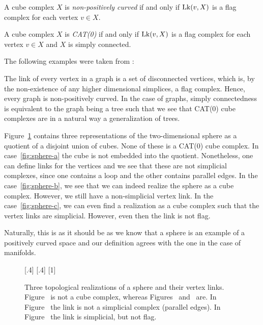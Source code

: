 \begin{thm}
  \label{thm:link}
  A cube complex \(X\) is \emph{non-positively curved} if and only if \(\operatorname{Lk}(v,X)\) is a flag complex for each vertex \(v \in X\).

  A cube complex \(X\) is \emph{CAT(0)} if and only if \(\operatorname{Lk}(v,X)\)  is a flag complex for each vertex \(v \in X\) and \(X\) is simply connected.
\end{thm}

The following examples were taken from \textcite{sageev-lecture-notes}:
\begin{bsp}[Graphs]
  \label{bsp:ccc-graph}
  The link of every vertex in a graph is a set of disconnected vertices, which is, by the non-existence of any higher dimensional simplices, a flag complex. Hence, every graph is non-positively curved. In the case of graphs, simply connectedness is equivalent to the graph being a tree such that we see that CAT(0) cube complexes are in a natural way a generalization of trees.
\end{bsp}
\begin{bsp}[Sphere]
  \label{bsp:ccc-sphere}
  Figure~\ref{fig:sphere} contains three representations of the two-dimensional sphere as a quotient of a disjoint union of cubes. None of these is a CAT(0) cube complex. In case~\ref{fig:sphere-a} the cube is not embedded  into the quotient. Nonetheless, one can define links for the vertices and we see that these are not simplicial complexes, since one contains a loop and the other contains parallel edges. In the case~\ref{fig:sphere-b}, we see that we can indeed realize the sphere as a cube complex. However, we still have a non-simplicial vertex link. In the case~\ref{fig:sphere-c}, we can even find a realization as a cube complex such that the vertex links are simplicial. However, even then the link is not flag.

  Naturally, this is as it should be as we know that a sphere is an example of a positively curved space and our definition agrees with the one in the case of manifolds.
  \begin{figure}[htbp]
    \centering
    \subcaptionbox{\label{fig:sphere-a}}[.4\linewidth]{}%
    \subcaptionbox{\label{fig:sphere-b}}[.4\linewidth]{}
    \subcaptionbox{\label{fig:sphere-c}}[1\linewidth]{}%
    \caption{Three topological realizations of a sphere and their vertex links. Figure~ is not a cube complex, whereas Figures~ and~ are. In Figure~ the link is not a simplicial complex (parallel edges). In Figure~ the link is simplicial, but not flag.}
    \label{fig:sphere}
  \end{figure}
\end{bsp}
